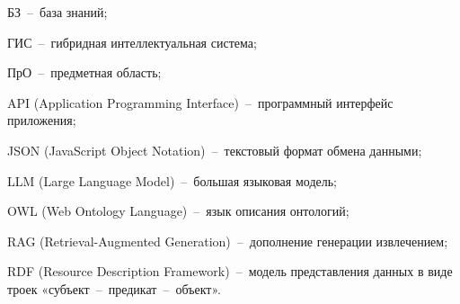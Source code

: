 \label{sec:reduction}

БЗ~--~база знаний;

ГИС~--~гибридная интеллектуальная система;

ПрО~--~предметная область;

API (Application Programming Interface)~--~программный интерфейс приложения;

JSON (JavaScript Object Notation)~--~текстовый формат обмена данными;

LLM (Large Language Model)~--~большая языковая модель;

OWL (Web Ontology Language)~--~язык описания онтологий;

RAG (Retrieval-Augmented Generation)~--~дополнение генерации извлечением;

RDF (Resource Description Framework)~--~модель представления данных в виде троек
«субъект~--~предикат~--~объект».

